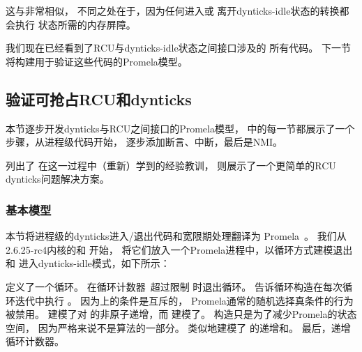 \begin{fcvref}
这与非常相似，
不同之处在于，因为任何进入或
离开dynticks-idle状态的转换都会执行
状态所需的内存屏障。
\end{fcvref}

我们现在已经看到了RCU与dynticks-idle状态之间接口涉及的
所有代码。
下一节将构建用于验证这些代码的Promela模型。

\QuickQuizEnd

\subsection{验证可抢占RCU和dynticks}
\label{sec:formal:Validating Preemptible RCU and dynticks}

本节逐步开发dynticks与RCU之间接口的Promela模型，
中的每一节都展示了一个步骤，从进程级代码开始，
逐步添加断言、中断，最后是NMI。

列出了
在这一过程中（重新）学到的经验教训，
则展示了一个更简单的RCU dynticks问题解决方案。

\subsubsection{基本模型}
\label{sec:formal:Basic Model}

本节将进程级的dynticks进入/退出代码和宽限期处理翻译为
Promela~\cite{Holzmann03a}。
我们从2.6.25-rc4内核的和
开始，
将它们放入一个Promela进程中，以循环方式建模退出和
进入dynticks-idle模式，如下所示：



\begin{fcvref}
定义了一个循环。
在循环计数器~超过限制
时退出循环。
告诉循环构造在每次循环迭代中执行
。
因为上的条件是互斥的，
Promela通常的随机选择真条件的行为被禁用。
建模了对
的非原子递增，而
建模了。
构造只是为了减少Promela的状态空间，
因为严格来说不是算法的一部分。
类似地建模了
的递增和。
最后，递增循环计数器。
\end{fcvref}

